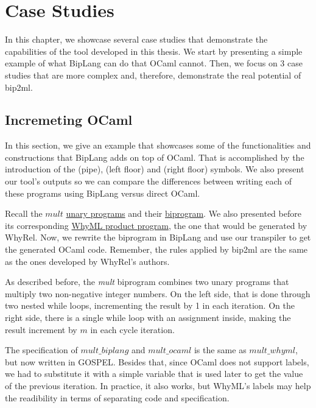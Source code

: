 
%

\chapter{Case Studies}
\label{cha:case_studies}

In this chapter, we showcase several case studies that demonstrate the capabilities of the tool developed in this thesis.
We start by presenting a simple example of what BipLang can do that OCaml cannot.
Then, we focus on 3 case studies that are more complex and, therefore, demonstrate the real potential of bip2ml.


\section{Incremeting OCaml}
\label{sec:incrementing}

In this section, we give an example that showcases some of the functionalities and constructions that BipLang adds on top of OCaml.
That is accomplished by the introduction of the \bm{$\langle|\rangle$} (pipe), \bm{$\lfloor$} (left floor) and \bm{$\rfloor$} (right floor) symbols.
We also present our tool's outputs so we can compare the differences between writing each of these programs using BipLang versus direct OCaml.

Recall the $mult$ \hyperref[fig:mult_source_programs]{unary programs} and their \hyperref[fig:mult_biprogram]{biprogram}.
We also presented before its corresponding \hyperref[fig:translation_ex]{WhyML product program}, the one that would be generated by WhyRel.
Now, we rewrite the biprogram in BipLang and use our transpiler to get the generated OCaml code.
Remember, the rules applied by bip2ml are the same as the ones developed by WhyRel's authors.

As described before, the \emph{mult} biprogram combines two unary programs that multiply two non-negative integer numbers.
On the left side, that is done through two nested while loops, incrementing the result by 1 in each iteration.
On the right side, there is a single while loop with an assignment inside, making the result increment by $m$ in each cycle iteration.

The specification of $mult\_biplang$ and $mult\_ocaml$ is the same as $mult\_whyml$, but now written in GOSPEL.
Besides that, since OCaml does not support labels, we had to substitute it with a simple variable that is used later to get the value of the previous iteration.
In practice, it also works, but WhyML's labels may help the readibility in terms of separating code and specification.

